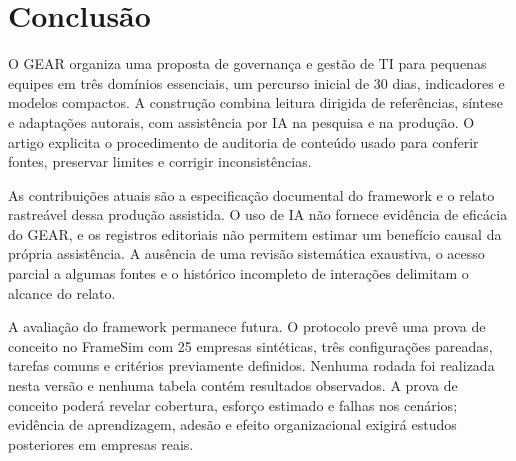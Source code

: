 \section{Conclusão}
\label{sec:conclusao}

O GEAR organiza uma proposta de governança e gestão de TI para pequenas equipes em três domínios essenciais, um percurso inicial de 30 dias, indicadores e modelos compactos. A construção combina leitura dirigida de referências, síntese e adaptações autorais, com assistência por IA na pesquisa e na produção. O artigo explicita o procedimento de auditoria de conteúdo usado para conferir fontes, preservar limites e corrigir inconsistências.

As contribuições atuais são a especificação documental do framework e o relato rastreável dessa produção assistida. O uso de IA não fornece evidência de eficácia do GEAR, e os registros editoriais não permitem estimar um benefício causal da própria assistência. A ausência de uma revisão sistemática exaustiva, o acesso parcial a algumas fontes e o histórico incompleto de interações delimitam o alcance do relato.

A avaliação do framework permanece futura. O protocolo prevê uma prova de conceito no FrameSim com 25 empresas sintéticas, três configurações pareadas, tarefas comuns e critérios previamente definidos. Nenhuma rodada foi realizada nesta versão e nenhuma tabela contém resultados observados. A prova de conceito poderá revelar cobertura, esforço estimado e falhas nos cenários; evidência de aprendizagem, adesão e efeito organizacional exigirá estudos posteriores em empresas reais.
